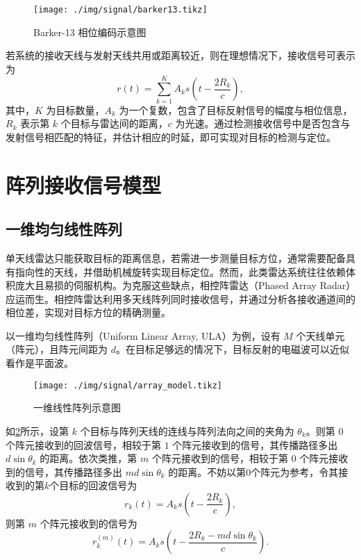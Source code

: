 \begin{figure}[htb!]
    \centering
    \texttt{[image: ./img/signal/barker13.tikz]}
    \caption{Barker-13 相位编码示意图}
    \label{fig_barker}
\end{figure}

若系统的接收天线与发射天线共用或距离较近，则在理想情况下，接收信号可表示为
\[
    r(t) = \sum_{k=1}^{K} A_k s\left(t - \frac{2 R_k}{c}\right),
\]
其中，$K$ 为目标数量，$A_k$ 为一个复数，包含了目标反射信号的幅度与相位信息，$R_k$ 表示第 $k$ 个目标与雷达间的距离，$c$ 为光速。通过检测接收信号中是否包含与发射信号相匹配的特征，并估计相应的时延，即可实现对目标的检测与定位。

\section{阵列接收信号模型}

\subsection{一维均匀线性阵列}
单天线雷达只能获取目标的距离信息，若需进一步测量目标方位，通常需要配备具有指向性的天线，并借助机械旋转实现目标定位。然而，此类雷达系统往往依赖体积庞大且易损的伺服机构。为克服这些缺点，相控阵雷达（Phased Array Radar）应运而生。相控阵雷达利用多天线阵列同时接收信号，并通过分析各接收通道间的相位差，实现对目标方位的精确测量。

以一维均匀线性阵列（Uniform Linear Array, ULA）为例，设有 $M$ 个天线单元（阵元），且阵元间距为 $d$。在目标足够远的情况下，目标反射的电磁波可以近似看作是平面波。

\begin{figure}[htb!]
    \centering
    \texttt{[image: ./img/signal/array\_model.tikz]}
    \caption{一维线性阵列示意图}
    \label{fig_array}
\end{figure}

如\cref{fig_array}所示，设第 $k$ 个目标与阵列天线的连线与阵列法向之间的夹角为 $\theta_k$。则第 $0$ 个阵元接收到的回波信号，相较于第 $1$ 个阵元接收到的信号，其传播路径多出 $d \sin\theta_k$ 的距离。依次类推，第 $m$ 个阵元接收到的信号，相较于第 $0$ 个阵元接收到的信号，其传播路径多出 $m d \sin\theta_k$ 的距离。不妨以第0个阵元为参考，令其接收到的第\( k \)个目标的回波信号为
\[
    r_k(t) = A_k s\left(t - \frac{2 R_k}{c}\right),
\]
则第 $m$ 个阵元接收到的信号为
\[
    r_k^{(m)}(t) = A_k s\left(t - \frac{2 R_k - m d \sin\theta_k}{c}\right).
\]

